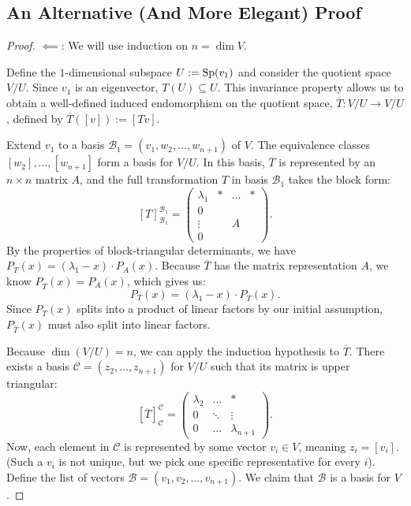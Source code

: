 \subsection{An Alternative (And More Elegant) Proof}

\begin{proof}
  $\impliedby$: We will use induction on $n = \dim V$.

  Define the $1$-dimensional subspace $U := \operatorname{Sp}(v_1)$ and consider the quotient space $V/U$. Since $v_1$ is an eigenvector, $T(U) \subseteq U$. This invariance property allows us to obtain a well-defined induced endomorphism on the quotient space, $\overline{T} : V/U \rightarrow V/U$, defined by $\overline{T}([v]) := [Tv]$.

  Extend $v_1$ to a basis $\mathcal{B}_1 = (v_1, w_2, \dots, w_{n+1})$ of $V$.
  The equivalence classes $[w_2], \dots, [w_{n+1}]$ form a basis for $V/U$. In this basis, $\overline{T}$ is represented by an $n \times n$ matrix $A$, and the full transformation $T$ in basis $\mathcal{B}_1$ takes the block form:
  \begin{equation} \label{eq:block_matrix_induction}
    [T]_{\mathcal{B}_1}^{\mathcal{B}_1} = \left(\begin{array}{c|ccc} \lambda_1 & * & \dots & * \\ \hline 0 & & & \\ \vdots & & A & \\ 0 & & & \end{array}\right).
  \end{equation}
  By the properties of block-triangular determinants, we have $P_T(x) = (\lambda_1 - x) \cdot P_A(x)$. Because $\overline{T}$ has the matrix representation $A$, we know $P_{\overline{T}}(x) = P_A(x)$, which gives us:
  \[ P_T(x) = (\lambda_1 - x) \cdot P_{\overline{T}}(x). \]
  Since $P_T(x)$ splits into a product of linear factors by our initial assumption, $P_{\overline{T}}(x)$ must also split into linear factors.

  Because $\dim(V/U) = n$, we can apply the induction hypothesis to $\overline{T}$. There exists a basis $\mathcal{C} = (z_2, \dots, z_{n+1})$ for $V/U$ such that its matrix is upper triangular:
  \begin{equation} \label{eq:quotient_upper_triangular}
    [\overline{T}]_{\mathcal{C}}^{\mathcal{C}} = \begin{pmatrix} \lambda_2 & \dots & * \\ 0 & \ddots & \vdots \\ 0 & \dots & \lambda_{n+1} \end{pmatrix}.
  \end{equation}
  Now, each element in $\mathcal{C}$ is represented by some vector $v_i \in V$, meaning $z_i = [v_i]$. (Such a $v_i$ is not unique, but we pick one specific representative for every $i$).
  Define the list of vectors $\mathcal{B} = (v_1, v_2, \dots, v_{n+1})$. We claim that $\mathcal{B}$ is a basis for $V$.


\end{proof}
